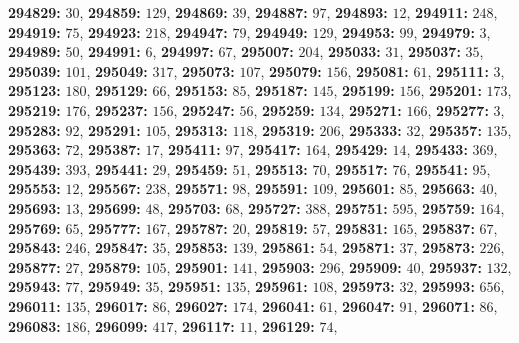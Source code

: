 \textsf{\bfseries 294829:} $30$, \textsf{\bfseries 294859:} $129$, \textsf{\bfseries 294869:} $39$, \textsf{\bfseries 294887:} $97$, \textsf{\bfseries 294893:} $12$, \textsf{\bfseries 294911:} $248$, \textsf{\bfseries 294919:} $75$, \textsf{\bfseries 294923:} $218$, \textsf{\bfseries 294947:} $79$, \textsf{\bfseries 294949:} $129$, \textsf{\bfseries 294953:} $99$, \textsf{\bfseries 294979:} $3$, \textsf{\bfseries 294989:} $50$, \textsf{\bfseries 294991:} $6$, \textsf{\bfseries 294997:} $67$, \textsf{\bfseries 295007:} $204$, \textsf{\bfseries 295033:} $31$, \textsf{\bfseries 295037:} $35$, \textsf{\bfseries 295039:} $101$, \textsf{\bfseries 295049:} $317$, \textsf{\bfseries 295073:} $107$, \textsf{\bfseries 295079:} $156$, \textsf{\bfseries 295081:} $61$, \textsf{\bfseries 295111:} $3$, \textsf{\bfseries 295123:} $180$, \textsf{\bfseries 295129:} $66$, \textsf{\bfseries 295153:} $85$, \textsf{\bfseries 295187:} $145$, \textsf{\bfseries 295199:} $156$, \textsf{\bfseries 295201:} $173$, \textsf{\bfseries 295219:} $176$, \textsf{\bfseries 295237:} $156$, \textsf{\bfseries 295247:} $56$, \textsf{\bfseries 295259:} $134$, \textsf{\bfseries 295271:} $166$, \textsf{\bfseries 295277:} $3$, \textsf{\bfseries 295283:} $92$, \textsf{\bfseries 295291:} $105$, \textsf{\bfseries 295313:} $118$, \textsf{\bfseries 295319:} $206$, \textsf{\bfseries 295333:} $32$, \textsf{\bfseries 295357:} $135$, \textsf{\bfseries 295363:} $72$, \textsf{\bfseries 295387:} $17$, \textsf{\bfseries 295411:} $97$, \textsf{\bfseries 295417:} $164$, \textsf{\bfseries 295429:} $14$, \textsf{\bfseries 295433:} $369$, \textsf{\bfseries 295439:} $393$, \textsf{\bfseries 295441:} $29$, \textsf{\bfseries 295459:} $51$, \textsf{\bfseries 295513:} $70$, \textsf{\bfseries 295517:} $76$, \textsf{\bfseries 295541:} $95$, \textsf{\bfseries 295553:} $12$, \textsf{\bfseries 295567:} $238$, \textsf{\bfseries 295571:} $98$, \textsf{\bfseries 295591:} $109$, \textsf{\bfseries 295601:} $85$, \textsf{\bfseries 295663:} $40$, \textsf{\bfseries 295693:} $13$, \textsf{\bfseries 295699:} $48$, \textsf{\bfseries 295703:} $68$, \textsf{\bfseries 295727:} $388$, \textsf{\bfseries 295751:} $595$, \textsf{\bfseries 295759:} $164$, \textsf{\bfseries 295769:} $65$, \textsf{\bfseries 295777:} $167$, \textsf{\bfseries 295787:} $20$, \textsf{\bfseries 295819:} $57$, \textsf{\bfseries 295831:} $165$, \textsf{\bfseries 295837:} $67$, \textsf{\bfseries 295843:} $246$, \textsf{\bfseries 295847:} $35$, \textsf{\bfseries 295853:} $139$, \textsf{\bfseries 295861:} $54$, \textsf{\bfseries 295871:} $37$, \textsf{\bfseries 295873:} $226$, \textsf{\bfseries 295877:} $27$, \textsf{\bfseries 295879:} $105$, \textsf{\bfseries 295901:} $141$, \textsf{\bfseries 295903:} $296$, \textsf{\bfseries 295909:} $40$, \textsf{\bfseries 295937:} $132$, \textsf{\bfseries 295943:} $77$, \textsf{\bfseries 295949:} $35$, \textsf{\bfseries 295951:} $135$, \textsf{\bfseries 295961:} $108$, \textsf{\bfseries 295973:} $32$, \textsf{\bfseries 295993:} $656$, \textsf{\bfseries 296011:} $135$, \textsf{\bfseries 296017:} $86$, \textsf{\bfseries 296027:} $174$, \textsf{\bfseries 296041:} $61$, \textsf{\bfseries 296047:} $91$, \textsf{\bfseries 296071:} $86$, \textsf{\bfseries 296083:} $186$, \textsf{\bfseries 296099:} $417$, \textsf{\bfseries 296117:} $11$, \textsf{\bfseries 296129:} $74$, 
